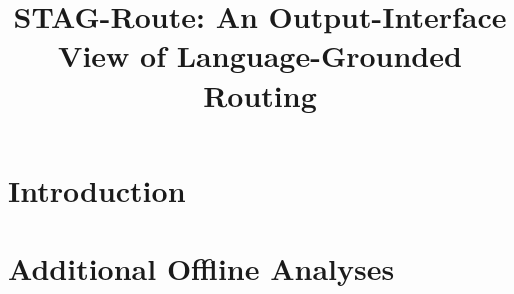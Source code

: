 \documentclass[letterpaper]{article}
\title{STAG-Route: An Output-Interface View of Language-Grounded Routing}
\author{}
\begin{document}
\maketitle



\section{Introduction}
\label{sec:introduction}








\appendix
\section{Additional Offline Analyses}
\label{app:additional-offline}



\end{document}
